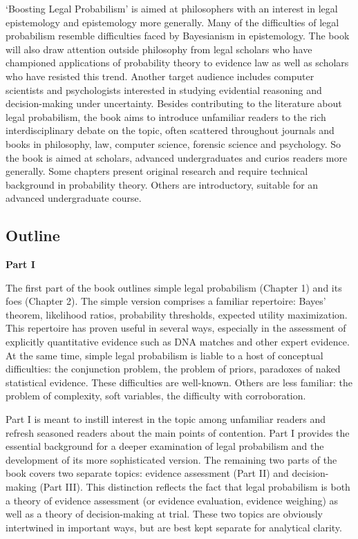 \documentclass[10pt,dvipsnames,enabledeprecatedfontcommands]{scrartcl}
\begin{document}
`Boosting Legal Probabilism' is aimed at philosophers with an interest
in legal epistemology and epistemology more generally. Many of the
difficulties of legal probabilism resemble difficulties faced by
Bayesianism in epistemology. The book will also draw attention outside
philosophy from legal scholars who have championed applications of
probability theory to evidence law as well as scholars who have resisted
this trend. Another target audience includes computer scientists and
psychologists interested in studying evidential reasoning and
decision-making under uncertainty. Besides contributing to the
literature about legal probabilism, the book aims to introduce
unfamiliar readers to the rich interdisciplinary debate on the topic,
often scattered throughout journals and books in philosophy, law,
computer science, forensic science and psychology. So the book is aimed
at scholars, advanced undergraduates and curios readers more generally.
Some chapters present original research and require technical background
in probability theory. Others are introductory, suitable for an advanced
undergraduate course.

\hypertarget{outline}{%
\subsection{Outline}\label{outline}}

\noindent \textbf{Part I}

\noindent The first part of the book outlines simple legal probabilism
(Chapter 1) and its foes (Chapter 2). The simple version comprises a
familiar repertoire: Bayes' theorem, likelihood ratios, probability
thresholds, expected utility maximization. This repertoire has proven
useful in several ways, especially in the assessment of explicitly
quantitative evidence such as DNA matches and other expert evidence. At
the same time, simple legal probabilism is liable to a host of
conceptual difficulties: the conjunction problem, the problem of priors,
paradoxes of naked statistical evidence. These difficulties are
well-known. Others are less familiar: the problem of complexity, soft
variables, the difficulty with corroboration.

Part I is meant to instill interest in the topic among unfamiliar
readers and refresh seasoned readers about the main points of
contention. Part I provides the essential background for a deeper
examination of legal probabilism and the development of its more
sophisticated version. The remaining two parts of the book covers two
separate topics: evidence assessment (Part II) and decision-making (Part
III). This distinction reflects the fact that legal probabilism is both
a theory of evidence assessment (or evidence evaluation, evidence
weighing) as well as a theory of decision-making at trial. These two
topics are obviously intertwined in important ways, but are best kept
separate for analytical clarity.
\end{document}
